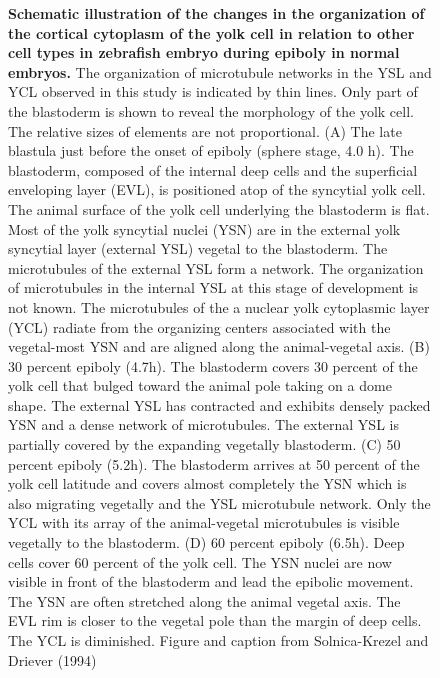 \begin{figure}
\caption{\textbf{Schematic illustration of the changes in the organization of the cortical cytoplasm of the yolk cell in relation to other cell types in zebrafish embryo during epiboly in normal embryos.} The organization of microtubule networks in the YSL and YCL observed in this study is indicated by thin lines. Only part of the blastoderm is shown to reveal the morphology of the yolk cell. The relative sizes of elements are not proportional. (A) The late blastula just before the onset of epiboly (sphere stage, 4.0 h). The blastoderm, composed of the internal deep cells and the superficial enveloping layer (EVL), is positioned atop of the syncytial yolk cell. The animal surface of the yolk cell underlying the blastoderm is flat. Most of the yolk syncytial nuclei (YSN) are in the external yolk syncytial layer (external YSL) vegetal to the blastoderm. The microtubules of the external YSL form a network. The organization of microtubules in the internal YSL at this stage of development is not known. The microtubules of the a nuclear yolk cytoplasmic layer (YCL) radiate from the organizing centers associated with the vegetal-most YSN and are aligned along the animal-vegetal axis. (B) 30 percent epiboly (4.7h). The blastoderm covers 30 percent of the yolk cell that bulged toward the animal pole taking on a dome shape. The external YSL has contracted and exhibits densely packed YSN and a dense network of microtubules. The external YSL is partially covered by the expanding vegetally blastoderm. (C) 50 percent epiboly (5.2h). The blastoderm arrives at 50 percent of the yolk cell latitude and covers almost completely the YSN which is also migrating vegetally and the YSL microtubule network. Only the YCL with its array of the animal-vegetal microtubules is visible vegetally to the blastoderm. (D) 60 percent epiboly (6.5h). Deep cells cover 60 percent of the yolk cell. The YSN nuclei are now visible in front of the blastoderm and lead the epibolic movement. The YSN are often stretched along the animal vegetal axis. The EVL rim is closer to the vegetal pole than the margin of deep cells. The YCL is diminished. Figure and caption from Solnica-Krezel and Driever (1994) \cite{SolnicaKrezel:1994wl}}
\label{zebrafish_10h_review_krezel_1994}
\end{figure}

